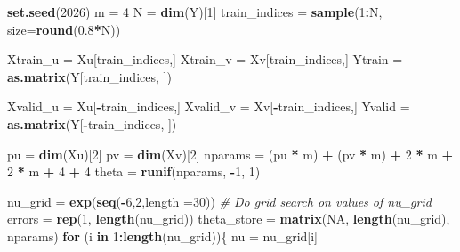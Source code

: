 \documentclass[12pt,halfline,a4paper,]{ouparticle}
\newenvironment{Shaded}{\begin{snugshade}}{\end{snugshade}}
\newcommand{\AttributeTok}[1]{\textcolor[rgb]{0.13,0.29,0.53}{#1}}
\newcommand{\CommentTok}[1]{\textcolor[rgb]{0.56,0.35,0.01}{\textit{#1}}}
\newcommand{\ConstantTok}[1]{\textcolor[rgb]{0.56,0.35,0.01}{#1}}
\newcommand{\ControlFlowTok}[1]{\textcolor[rgb]{0.13,0.29,0.53}{\textbf{#1}}}
\newcommand{\DecValTok}[1]{\textcolor[rgb]{0.00,0.00,0.81}{#1}}
\newcommand{\FloatTok}[1]{\textcolor[rgb]{0.00,0.00,0.81}{#1}}
\newcommand{\FunctionTok}[1]{\textcolor[rgb]{0.13,0.29,0.53}{\textbf{#1}}}
\newcommand{\NormalTok}[1]{#1}
\newcommand{\OtherTok}[1]{\textcolor[rgb]{0.56,0.35,0.01}{#1}}
\newcommand{\SpecialCharTok}[1]{\textcolor[rgb]{0.81,0.36,0.00}{\textbf{#1}}}
\begin{document}
\begin{Shaded}
\begin{Highlighting}[]
\FunctionTok{set.seed}\NormalTok{(}\DecValTok{2026}\NormalTok{)}
\NormalTok{m }\OtherTok{=} \DecValTok{4}
\NormalTok{N }\OtherTok{=} \FunctionTok{dim}\NormalTok{(Y)[}\DecValTok{1}\NormalTok{]}
\NormalTok{train\_indices }\OtherTok{=} \FunctionTok{sample}\NormalTok{(}\DecValTok{1}\SpecialCharTok{:}\NormalTok{N, }\AttributeTok{size=}\FunctionTok{round}\NormalTok{(}\FloatTok{0.8}\SpecialCharTok{*}\NormalTok{N))}

\NormalTok{Xtrain\_u }\OtherTok{=}\NormalTok{ Xu[train\_indices,]}
\NormalTok{Xtrain\_v }\OtherTok{=}\NormalTok{ Xv[train\_indices,]}
\NormalTok{Ytrain }\OtherTok{=} \FunctionTok{as.matrix}\NormalTok{(Y[train\_indices, ])}
     
\NormalTok{Xvalid\_u }\OtherTok{=}\NormalTok{ Xu[}\SpecialCharTok{{-}}\NormalTok{train\_indices,]}
\NormalTok{Xvalid\_v }\OtherTok{=}\NormalTok{ Xv[}\SpecialCharTok{{-}}\NormalTok{train\_indices,]}
\NormalTok{Yvalid }\OtherTok{=} \FunctionTok{as.matrix}\NormalTok{(Y[}\SpecialCharTok{{-}}\NormalTok{train\_indices, ])}

\NormalTok{pu }\OtherTok{=} \FunctionTok{dim}\NormalTok{(Xu)[}\DecValTok{2}\NormalTok{]}
\NormalTok{pv }\OtherTok{=} \FunctionTok{dim}\NormalTok{(Xv)[}\DecValTok{2}\NormalTok{]}
\NormalTok{nparams }\OtherTok{=}\NormalTok{ (pu }\SpecialCharTok{*}\NormalTok{ m) }\SpecialCharTok{+}\NormalTok{ (pv }\SpecialCharTok{*}\NormalTok{ m) }\SpecialCharTok{+} \DecValTok{2} \SpecialCharTok{*}\NormalTok{ m  }\SpecialCharTok{+} \DecValTok{2} \SpecialCharTok{*}\NormalTok{ m }\SpecialCharTok{+} \DecValTok{4} \SpecialCharTok{+} \DecValTok{4}
\NormalTok{theta }\OtherTok{=} \FunctionTok{runif}\NormalTok{(nparams, }\SpecialCharTok{{-}}\DecValTok{1}\NormalTok{, }\DecValTok{1}\NormalTok{)}

\NormalTok{nu\_grid }\OtherTok{=} \FunctionTok{exp}\NormalTok{(}\FunctionTok{seq}\NormalTok{(}\SpecialCharTok{{-}}\DecValTok{6}\NormalTok{,}\DecValTok{2}\NormalTok{,length}
            \OtherTok{=}\DecValTok{30}\NormalTok{))}
\CommentTok{\# Do grid search on values of nu\_grid}
\NormalTok{errors }\OtherTok{=} \FunctionTok{rep}\NormalTok{(}\DecValTok{1}\NormalTok{, }\FunctionTok{length}\NormalTok{(nu\_grid))}
\NormalTok{theta\_store }\OtherTok{=} \FunctionTok{matrix}\NormalTok{(}\ConstantTok{NA}\NormalTok{, }\FunctionTok{length}\NormalTok{(nu\_grid), nparams)}
\ControlFlowTok{for}\NormalTok{ (i }\ControlFlowTok{in} \DecValTok{1}\SpecialCharTok{:}\FunctionTok{length}\NormalTok{(nu\_grid))\{}
\NormalTok{  nu }\OtherTok{=}\NormalTok{ nu\_grid[i]}
  

\end{Highlighting}
\end{Shaded}
\end{document}
